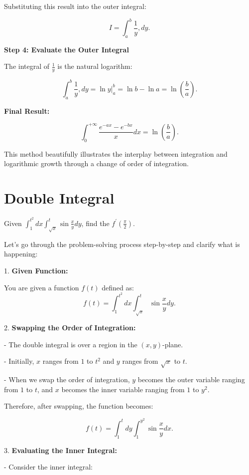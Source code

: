 \documentclass[a4paper,12pt]{book}
\begin{document}
Substituting this result into the outer integral:

\[
I = \int_a^b \frac{1}{y} , dy.
\]

\hrulefill

\textbf{Step 4: Evaluate the Outer Integral}

The integral of \( \frac{1}{y} \) is the natural logarithm:

\[
\int_a^b \frac{1}{y} , dy = \ln y \big|_a^b = \ln b - \ln a = \ln\left(\frac{b}{a}\right).
\]

\hrulefill

\textbf{Final Result:}

\[
\int_0^{+\infty} \frac{e^{-ax} - e^{-bx}}{x} dx = \ln\left(\frac{b}{a}\right).
\]

This method beautifully illustrates the interplay between integration and logarithmic growth through a change of order of integration.

\chapter{Double Integral}

Given \(\int_1^{t^2} dx \int_{\sqrt{x}}^t \sin{\frac{x}{y}} dy\), find the \( f^{\prime} (\frac{\pi}{2})\).

Let’s go through the problem-solving process step-by-step and clarify what is happening:

1. \textbf{Given Function:}

   You are given a function \(f(t)\) defined as:
   \[
   f(t) = \int_1^{t^2} dx \int_{\sqrt{x}}^t \sin{\frac{x}{y}} dy.
   \]

2. \textbf{Swapping the Order of Integration:}

   - The double integral is over a region in the \((x, y)\)-plane.
   
   - Initially, \(x\) ranges from \(1\) to \(t^2\) and \(y\) ranges from \(\sqrt{x}\) to \(t\).
   
   - When we swap the order of integration, \(y\) becomes the outer variable ranging from \(1\) to \(t\), and \(x\) becomes the inner variable ranging from \(1\) to \(y^2\).

   Therefore, after swapping, the function becomes:
   
   \[
   f(t) = \int_1^t dy \int_1^{y^2} \sin{\frac{x}{y}} dx.
   \]

3. \textbf{Evaluating the Inner Integral:}

   - Consider the inner integral:
   
\end{document}
